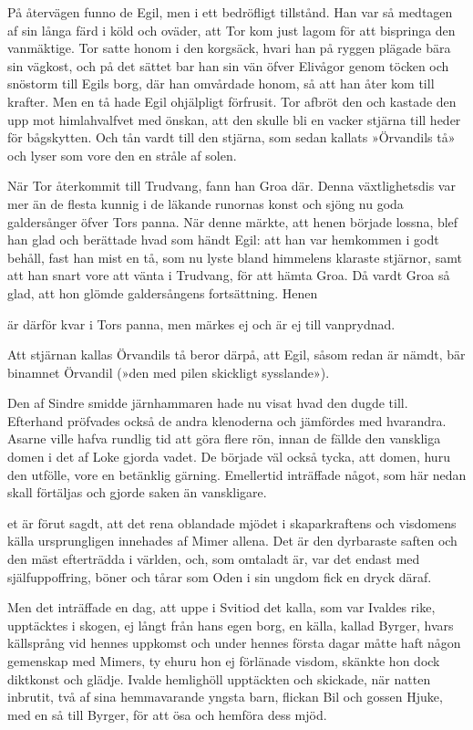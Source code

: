 På återvägen funno de Egil, men i ett bedröfligt tillstånd. Han var så
medtagen af sin långa färd i köld och oväder, att Tor kom just lagom för
att bispringa den vanmäktige. Tor satte honom i den korgsäck, hvari han
på ryggen plägade bära sin vägkost, och på det sättet bar han sin vän
öfver Elivågor genom töcken och snöstorm till Egils borg, där han
omvårdade honom, så att han åter kom till krafter. Men en tå hade Egil
ohjälpligt förfrusit. Tor afbröt den och kastade den upp mot
himlahvalfvet med önskan, att den skulle bli en vacker stjärna till
heder för bågskytten. Och tån vardt till den stjärna, som sedan kallats
»Örvandils tå» och lyser som vore den en stråle af solen.

När Tor återkommit till Trudvang, fann han Groa där. Denna
växtlighetsdis var mer än de flesta kunnig i de läkande runornas konst
och sjöng nu goda galdersånger öfver Tors panna. När denne märkte, att
henen började lossna, blef han glad och berättade hvad som händt Egil:
att han var hemkommen i godt behåll, fast han mist en tå, som nu lyste
bland himmelens klaraste stjärnor, samt att han snart vore att vänta i
Trudvang, för att hämta Groa. Då vardt Groa så glad, att hon glömde
galdersångens fortsättning. Henen

är därför kvar i Tors panna, men märkes ej och är ej till vanprydnad.

Att stjärnan kallas Örvandils tå beror därpå, att Egil, såsom redan är
nämdt, bär binamnet Örvandil (»den med pilen skickligt sysslande»).

Den af Sindre smidde järnhammaren hade nu visat hvad den dugde till.
Efterhand pröfvades också de andra klenoderna och jämfördes med
hvarandra. Asarne ville hafva rundlig tid att göra flere rön, innan de
fällde den vanskliga domen i det af Loke gjorda vadet. De började väl
också tycka, att domen, huru den utfölle, vore en betänklig gärning.
Emellertid inträffade något, som här nedan skall förtäljas och gjorde
saken än vanskligare.

\endSecII


\dropcapD et är förut sagdt, att det rena oblandade mjödet i skaparkraftens och
visdomens källa ursprungligen innehades af Mimer allena. Det är den
dyrbaraste saften och den mäst efterträdda i världen, och, som omtaladt
är, var det endast med själfuppoffring, böner och tårar som Oden i sin
ungdom fick en dryck däraf.

Men det inträffade en dag, att uppe i Svitiod det kalla, som var Ivaldes
rike, upptäcktes i skogen, ej långt från hans egen borg, en källa,
kallad Byrger, hvars källsprång vid hennes uppkomst och under hennes
första dagar måtte haft någon gemenskap med Mimers, ty ehuru hon ej
förlänade visdom, skänkte hon dock diktkonst och glädje. Ivalde
hemlighöll upptäckten och skickade, när natten inbrutit, två af sina
hemmavarande yngsta barn, flickan Bil och gossen Hjuke, med en så till
Byrger, för att ösa och hemföra dess mjöd.

